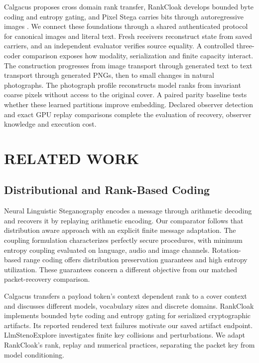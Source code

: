 \documentclass[a4paper,twoside]{article}
\begin{document}
Calgacus proposes cross domain rank transfer, RankCloak develops bounded byte coding and entropy gating, and Pixel Stega carries bits through autoregressive images \cite{calgacus,rankcloak,pixelstega}. We connect these foundations through a shared authenticated protocol for canonical images and literal text. Fresh receivers reconstruct state from saved carriers, and an independent evaluator verifies source equality. A controlled three-coder comparison exposes how modality, serialization and finite capacity interact.
The construction progresses from image transport through generated text to text transport through generated PNGs, then to small changes in natural photographs. The photograph profile reconstructs model ranks from invariant coarse pixels without access to the original cover. A paired parity baseline tests whether these learned partitions improve embedding. Declared observer detection and exact GPU replay comparisons complete the evaluation of recovery, observer knowledge and execution cost.

\space

\section{\uppercase{Related Work}}
\label{sec:related}

\subsection{Distributional and Rank-Based Coding}

Neural Linguistic Steganography \cite{ziegler} encodes a message through arithmetic decoding and recovers it by replaying arithmetic encoding. Our comparator follows that distribution aware approach with an explicit finite message adaptation.
The coupling formulation \cite{coupling} characterizes perfectly secure procedures, with minimum entropy coupling evaluated on language, audio and image channels. Rotation-based range coding \cite{range} offers distribution preservation guarantees and high entropy utilization. These guarantees concern a different objective from our matched packet-recovery comparison.

Calgacus \cite{calgacus} transfers a payload token's context dependent rank to a cover context and discusses different models, vocabulary sizes and discrete domains. RankCloak \cite{rankcloak} implements bounded byte coding and entropy gating for serialized cryptographic artifacts. Its reported rendered text failures motivate our saved artifact endpoint. LlmStenoExplore \cite{explore} investigates finite key collisions and perturbations. We adapt RankCloak's rank, replay and numerical practices, separating the packet key from model conditioning.
\end{document}
